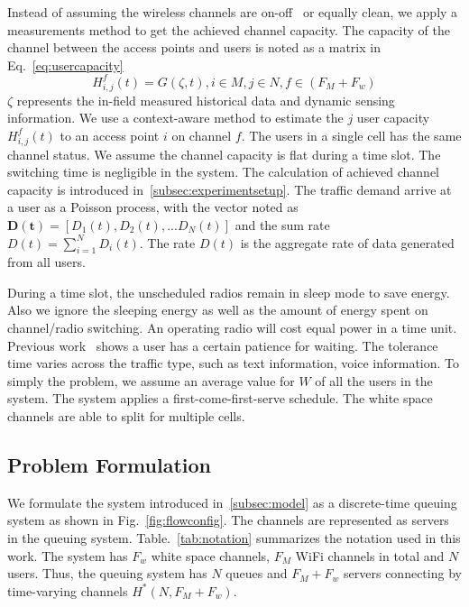 Instead of assuming the wireless channels are on-off~\cite{bodas2012low} or equally clean, we apply a  
measurements method to get the achieved channel capacity. The capacity of the channel between the access 
points and users is noted as a matrix in Eq.~\ref{eq:usercapacity}
\begin{equation}
\label{eq:usercapacity}
H_{i,j}^f(t)= G(\zeta,t),i \in M, j\in N, f \in (F_M+F_w) 
\end{equation} 
$\zeta$ represents the in-field measured historical data and dynamic sensing information.
We use a context-aware method to estimate the $j$ user capacity $H_{i,j}^f(t)$ to an access point 
$i$ on channel $f$. The users in a single cell has the same channel status. We assume the channel 
capacity is flat during a time slot. The switching time is negligible in the system.
The calculation of achieved channel capacity is introduced in~\ref{subsec:experimentsetup}. 
The traffic demand arrive at a user as a Poisson process, with the vector noted as 
$\bm{D(t)} = [D_1(t),D_2(t),...D_N(t)]$ and the sum rate $D(t) = \sum\limits_{i=1}^N D_i(t)$. 
The rate $D(t)$ is the aggregate rate of data generated from all users. 

During a time slot, the unscheduled radios remain in sleep mode to save energy. Also we ignore 
the sleeping energy as well as the amount of energy spent on channel/radio switching. An operating 
radio will cost equal power in a time unit. Previous work~\cite{niida2010user} shows a user has a 
certain patience for waiting. The tolerance time varies across the traffic type, such as text information, 
voice information. To simply the problem, we assume an average value for $W$ of all the users in the system. 
The system applies a first-come-first-serve schedule. The white space channels are able to split for multiple 
cells.

\subsection{Problem Formulation}
\label{subsec:problem}

We formulate the system introduced in~\ref{subsec:model} as a discrete-time queuing system as shown in 
Fig.~\ref{fig:flowconfig}. 
The channels are represented as servers in the queuing system. 
Table.~\ref{tab:notation} summarizes the notation used in this work. 
The system has $F_w$ white space channels, $F_M$ WiFi channels in total and $N$ users.
Thus, the queuing system has $N$ queues and $F_M+F_w$ servers connecting by time-varying 
channels $H^*(N,F_M+F_w)$.

